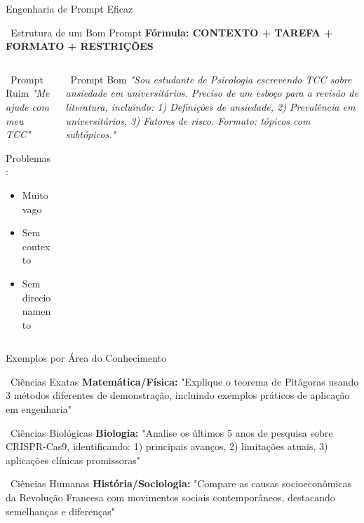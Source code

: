 \documentclass[aspectratio=169,12pt]{beamer}
\begin{document}
\begin{frame}{Engenharia de Prompt Eficaz}
    \begin{block}{\faCode\, Estrutura de um Bom Prompt}
        \textbf{Fórmula: CONTEXTO + TAREFA + FORMATO + RESTRIÇÕES}
    \end{block}
    \begin{columns}
        \begin{column}{0.5\textwidth}
            \begin{alertblock}{\faThumbsDown\, Prompt Ruim}
                \textit{"Me ajude com meu TCC"}
                
                \textcolor{danger}{Problemas:}
                \begin{itemize}
                    \item Muito vago
                    \item Sem contexto
                    \item Sem direcionamento
                \end{itemize}
            \end{alertblock}
        \end{column}
        \begin{column}{0.5\textwidth}
            \begin{exampleblock}{\faThumbsUp\, Prompt Bom}
                \textit{"Sou estudante de Psicologia escrevendo TCC sobre ansiedade em universitários. Preciso de um esboço para a revisão de literatura, incluindo: 1) Definições de ansiedade, 2) Prevalência em universitários, 3) Fatores de risco. Formato: tópicos com subtópicos."}
            \end{exampleblock}
        \end{column}
    \end{columns}
\end{frame}

\begin{frame}{Exemplos por Área do Conhecimento}
    \begin{block}{\faFlask\, Ciências Exatas}
        \textbf{Matemática/Física:} "Explique o teorema de Pitágoras usando 3 métodos diferentes de demonstração, incluindo exemplos práticos de aplicação em engenharia"
    \end{block}
    
    \begin{block}{\faLeaf\, Ciências Biológicas}
        \textbf{Biologia:} "Analise os últimos 5 anos de pesquisa sobre CRISPR-Cas9, identificando: 1) principais avanços, 2) limitações atuais, 3) aplicações clínicas promissoras"
    \end{block}
    
    \begin{block}{\faUsers\, Ciências Humanas}
        \textbf{História/Sociologia:} "Compare as causas socioeconômicas da Revolução Francesa com movimentos sociais contemporâneos, destacando semelhanças e diferenças"
    \end{block}
\end{frame}
\end{document}
